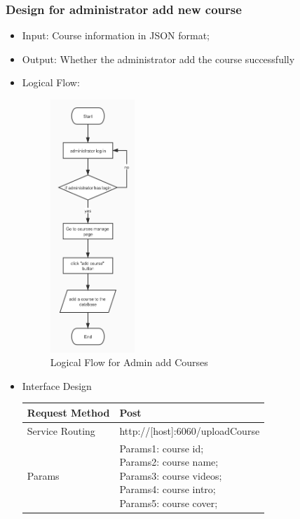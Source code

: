 \documentclass[16pt]{scrreprt}
\begin{document}
\subsubsection{Design for administrator add new course}
\begin{itemize}
	\item Input: Course information in JSON format; 
	\item Output: Whether the administrator add the course successfully
	\item Logical Flow:
	 \begin{figure}[H]
	\centering
	\includegraphics[width=0.3\textwidth]{diagrams/admin-add-course.jpg}
	\caption{Logical Flow for Admin add Courses}
\end{figure}
	\item Interface Design
	\begin{center}
    \begin{tabular}{p{5cm}p{10cm}}
        \hline
	    Request Method & Post\\
        \hline
	    Service Routing &  http://[host]:6060/uploadCourse\\
        \hline
	    Params & \makecell[l]{Params1: course id;\\Params2: course name;\\Params3: course videos;\\Params4: course intro;\\Params5: course cover;\\ }\\ 

\end{tabular}
\end{center}
\end{itemize}
\end{document}
